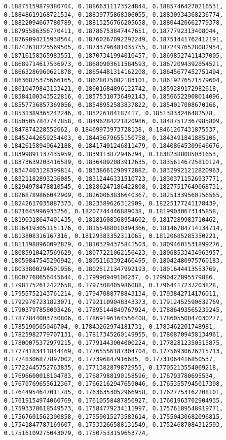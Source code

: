 \documentclass[11pt]{article}
\begin{document}
\begin{Verbatim}[commandchars=\\\{\}]
0.18875159879380704, 0.18866311173524844, 0.18857464270216531, 0.18848619168721534, 0.18839775868306055, 0.18830934368236774, 0.18822094667780789, 0.18813256766205658, 0.18804420662779378, 0.18795586356770411, 0.18786753847447651, 0.1877792313408044, 0.18769094215938564, 0.18760267092292249, 0.18751441762412191, 0.18742618225569505, 0.18733796481035755, 0.18724976528082954, 0.18716158365983551, 0.18707341994010457, 0.18698527411437005, 0.18689714617536973, 0.18680903611584593, 0.18672094392854521, 0.18663286960621878, 0.18654481314162208, 0.18645677452751494, 0.18636875375666165, 0.18628075082183101, 0.18619276571579604, 0.18610479843133421, 0.18601684896122742, 0.1859289172982618, 0.18584100343522816, 0.18575310736492143, 0.18566522908014096, 0.18557736857369056, 0.18548952583837822, 0.1854017008670166, 0.18531389365242246, 0.185226104187417, 0.18513833246482578, 0.18505057847747858, 0.18496284221820986, 0.18487512367985809, 0.1847874228552662, 0.18469973973728138, 0.18461207431875537, 0.18452442659254403, 0.18443679655150758, 0.1843491841885106, 0.18426158949642188, 0.18417401246811479, 0.18408645309646676, 0.18399891137435959, 0.1839113872946794, 0.18382388085031653, 0.18373639203416589, 0.18364892083912635, 0.18356146725810124, 0.18347403128399814, 0.18338661290972882, 0.18329921212820963, 0.18321182893236085, 0.18312446331510723, 0.18303711526937771, 0.18294978478810545, 0.18286247186422808, 0.18277517649068731, 0.18268789866042909, 0.18260063836640367, 0.18251339560156565, 0.18242617035887373, 0.1823389626312909, 0.18225177241178439, 0.1821645996933256, 0.18207744446889038, 0.18199030673145858, 0.18190318647401435, 0.18181608368954602, 0.1817289983710462, 0.18164193051151176, 0.18155488010394366, 0.18146784714134714, 0.1813808316167316, 0.18129383352311065, 0.18120685285350221, 0.18111988960092829, 0.18103294375841503, 0.18094601531899276, 0.18085910427569629, 0.18077221062156423, 0.18068533434963957, 0.18059847545296942, 0.18051163392460495, 0.18042480975760183, 0.18033800294501956, 0.18025121347992193, 0.1801644413553769, 0.18007768656445644, 0.179990949100237, 0.17990422895579886, 0.17981752612422658, 0.1797308405986088, 0.17964417237203828, 0.17955752143761214, 0.17947088778843134, 0.1793842714176011, 0.17929767231823071, 0.17921109048343373, 0.17912452590632769, 0.17903797858003426, 0.17895144849767924, 0.17886493565239245, 0.17877844003730806, 0.17869196164556408, 0.17860550047030277, 0.1785190565046704, 0.17843262974181731, 0.1783462201748981, 0.17825982779707131, 0.17817345260149955, 0.17808709458134961, 0.17800075372979215, 0.17791443004000224, 0.17782812350515875, 0.17774183411844469, 0.17765556187304704, 0.17756930676215713, 0.17748306877897002, 0.177396847916685, 0.17731064416850537, 0.17722445752763835, 0.1771382879872955, 0.17705213554069218, 0.17696600018104783, 0.17687988190158596, 0.176793780695534, 0.17670769655612367, 0.17662162947659046, 0.17653557945017398, 0.17644954647011785, 0.17636353052966958, 0.17627753162208101, 0.17619154974060769, 0.17610558487850927, 0.17601963702904935, 0.17593370618549573, 0.17584779234111997, 0.17576189548919771, 0.17567601562300858, 0.17559015273583614, 0.17550430682096815, 0.17541847787169607, 0.17533266588131549, 0.17524687084312593, 0.17516109275043079, 0.17507533159653774, 
\end{Verbatim}
\end{document}
